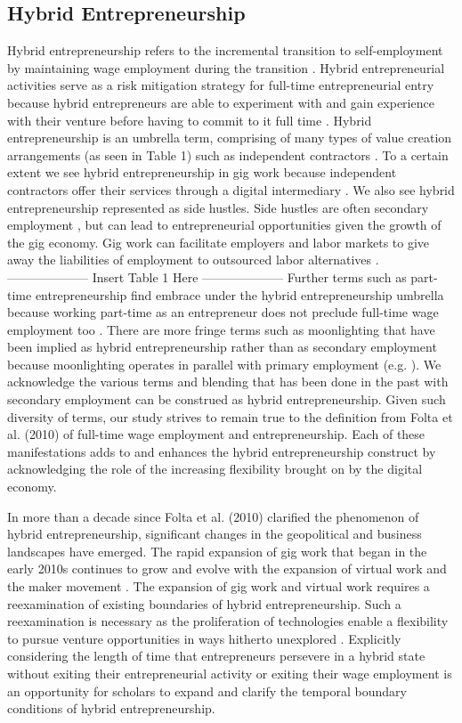\documentclass{article}
\begin{document}
\subsection{Hybrid Entrepreneurship}
Hybrid entrepreneurship refers to the incremental transition to self-employment by maintaining wage employment during the transition \cite{folta2010hybrid}.  Hybrid entrepreneurial activities serve as a risk mitigation strategy for full-time entrepreneurial entry because hybrid entrepreneurs are able to experiment with and gain experience with their venture before having to commit to it full time \cite{raffiee2014should}.  Hybrid entrepreneurship is an umbrella term, comprising of many types of value creation arrangements (as seen in Table 1) such as independent contractors \cite{folta2024call}.  To a certain extent we see hybrid entrepreneurship in gig work because independent contractors offer their services through a digital intermediary \cite{burtch2018can}.  We also see hybrid entrepreneurship represented as side hustles.  Side hustles are often secondary employment \cite{sessions2021do}, but can lead to entrepreneurial opportunities given the growth of the gig economy.  Gig work can facilitate employers and labor markets to give away the liabilities of employment to outsourced labor alternatives \cite{rogiers2024end}.  
--------------------
Insert Table 1 Here
--------------------
Further terms such as part-time entrepreneurship find embrace under the hybrid entrepreneurship umbrella because working part-time as an entrepreneur does not preclude full-time wage employment too \cite{petrova2012part}.  There are more fringe terms such as moonlighting that have been implied as hybrid entrepreneurship rather than as secondary employment because moonlighting operates in parallel with primary employment (e.g. \cite{maritz2023hybrid}).  We acknowledge the various terms and blending that has been done in the past with secondary employment can be construed as hybrid entrepreneurship. Given such diversity of terms, our study strives to remain true to the definition from Folta et al. (2010) of full-time wage employment and entrepreneurship. Each of these manifestations adds to and enhances the hybrid entrepreneurship construct by acknowledging the role of the increasing flexibility brought on by the digital economy.    

In more than a decade since Folta et al. (2010) clarified the phenomenon of hybrid entrepreneurship, significant changes in the geopolitical and business landscapes have emerged.  The rapid expansion of gig work that began in the early 2010s continues to grow and evolve with the expansion of virtual work \cite{nyberg2021people} and the maker movement \cite{browder2019emergence}. The expansion of gig work and virtual work requires a reexamination of existing boundaries of hybrid entrepreneurship.  Such a reexamination is necessary as the proliferation of technologies enable a flexibility to pursue venture opportunities in ways hitherto unexplored \cite{folta2024call}.  Explicitly considering the length of time that entrepreneurs persevere in a hybrid state without exiting their entrepreneurial activity or exiting their wage employment is an opportunity for scholars to expand and clarify the temporal boundary conditions of hybrid entrepreneurship.
\end{document}
